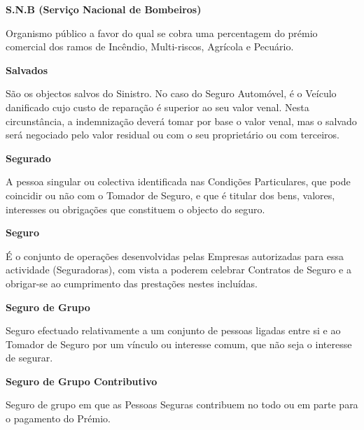\begin{description}
\item \textbf{S.N.B (Serviço Nacional de Bombeiros)}

Organismo público a favor do qual se cobra uma percentagem do prémio comercial dos ramos de Incêndio, Multi-riscos, Agrícola e Pecuário.
\end{description}

\begin{description}
\item \textbf{Salvados}

São os objectos salvos do Sinistro. No caso do Seguro Automóvel, é o Veículo danificado cujo custo de reparação é superior ao seu valor venal. Nesta circunstância, a indemnização deverá tomar por base o valor venal, mas o salvado será negociado pelo valor residual ou com o seu proprietário ou com terceiros.
\end{description}

\begin{description}
\item \textbf{Segurado}

A pessoa singular ou colectiva identificada nas Condições Particulares, que pode coincidir ou não com o Tomador de Seguro, e que é titular dos bens, valores, interesses ou obrigações que constituem o objecto do seguro.
\end{description}

\begin{description}
\item \textbf{Seguro}

É o conjunto de operações desenvolvidas pelas Empresas autorizadas para essa actividade (Seguradoras), com vista a poderem celebrar Contratos de Seguro e a obrigar-se ao cumprimento das prestações nestes incluídas.
\end{description}

\begin{description}
\item \textbf{Seguro de Grupo}

Seguro efectuado relativamente a um conjunto de pessoas ligadas entre si e ao Tomador de Seguro por um vínculo ou interesse comum, que não seja o interesse de segurar.
\end{description}

\begin{description}
\item \textbf{Seguro de Grupo Contributivo}

Seguro de grupo em que as Pessoas Seguras contribuem no todo ou em parte para o pagamento do Prémio.
\end{description}

